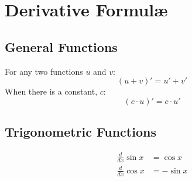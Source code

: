 \documentclass[../main.tex]{subfiles}
\begin{document}
\chapter{Derivative Formulæ}
\section{General Functions}
For any two functions $u$ and $v$:
\[ (u + v)' = u' + v' \]
When there is a constant, $c$:
\[ (c \cdot u)' = c \cdot u' \]
\section{Trigonometric Functions}
\begin{align*}
    \frac{d}{dx} \sin x &= \cos x\\
    \frac{d}{dx} \cos x &= - \sin x
\end{align*}
\end{document}
